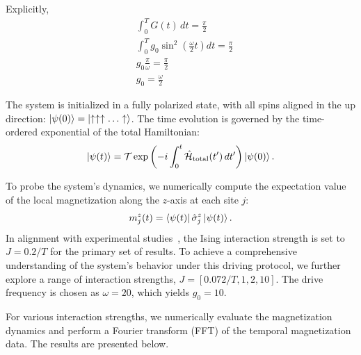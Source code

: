 \documentclass[a4paper, 11pt]{article}
\begin{document}
Explicitly,
\begin{align*}
    &\int_0^T G(t)\,dt = \frac{\pi}{2} \\
    &\int_0^T g_0\sin^2\left(\frac{\omega}{2}t \right) dt = \frac{\pi}{2}\\
    &g_0 \frac{\pi}{\omega} = \frac{\pi}{2}\\
    &\boxed{g_0 = \frac{\omega}{2}}
\end{align*}
 



The system is initialized in a fully polarized state, with all spins aligned in the up direction: $\displaystyle\ket{\psi(0)} = \ket{\uparrow\uparrow\uparrow\ldots\uparrow}$. The time evolution is governed by the time-ordered exponential of the total Hamiltonian:
\begin{equation}
    \ket{\psi(t)} = \mathcal{T} \exp\left(-i\int_0^t \hat{\mathcal{H}}_{\text{total}}(t')\,dt'\right) \ket{\psi(0)}.
\end{equation}

To probe the system's dynamics, we numerically compute the expectation value of the local magnetization along the $z$-axis at each site $j$:
\begin{equation}
    m_j^z(t) = \bra{\psi(t)} \hat{\sigma}_j^z \ket{\psi(t)}.
\end{equation}  
In alignment with experimental studies~\cite{Zhang2017}, the Ising interaction strength is set to $J = 0.2/T$ for the primary set of results. To achieve a comprehensive understanding of the system's behavior under this driving protocol, we further explore a range of interaction strengths, $J = [0.072/T, 1, 2, 10]$. The drive frequency is chosen as $\omega = 20$, which yields $g_0 = 10$.

For various interaction strengths, we numerically evaluate the magnetization dynamics and perform a Fourier transform (FFT) of the temporal magnetization data. The results are presented below.

\newpage
\end{document}
